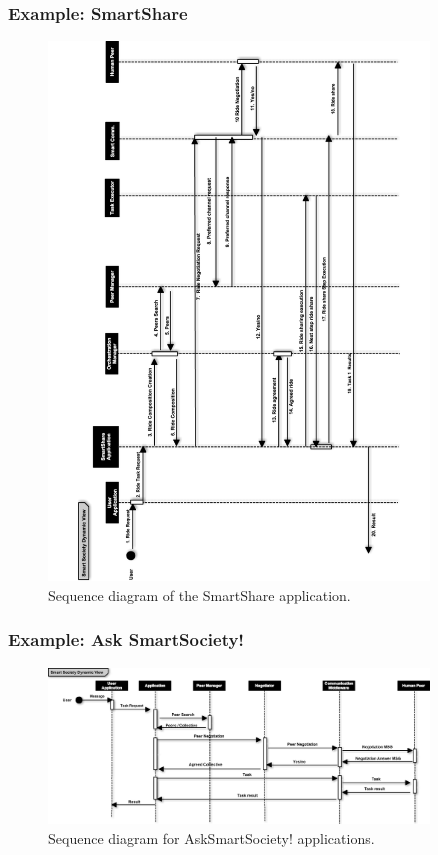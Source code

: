 \subsubsection{Example: SmartShare}
\begin{figure}
\centering
\includegraphics[width=0.9\textwidth]{./figs/sequenceRide}
\caption{Sequence diagram of the SmartShare application.}
\label{fig:dynamic_share}
\end{figure}
\subsubsection{Example: Ask SmartSociety!}
\begin{figure}
\centering
\includegraphics[width=0.9\textwidth]{./figs/sequenceAsk}
\caption{Sequence diagram for AskSmartSociety! applications.}
\label{fig:dynamic_ask}
\end{figure}